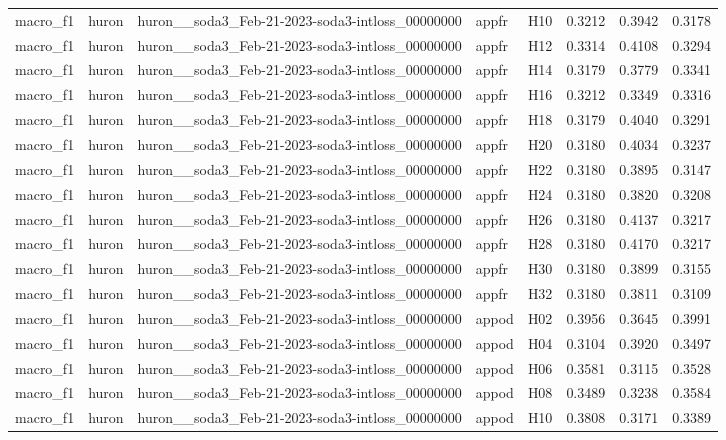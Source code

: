 \begin{table}[tbp]
\begin{tabular}{lllllrrr}
macro\_f1 & huron & huron\_\_soda3\_Feb-21-2023-soda3-intloss\_00000000 & appfr & H10 & 0.3212 & 0.3942 & 0.3178 \\
macro\_f1 & huron & huron\_\_soda3\_Feb-21-2023-soda3-intloss\_00000000 & appfr & H12 & 0.3314 & 0.4108 & 0.3294 \\
macro\_f1 & huron & huron\_\_soda3\_Feb-21-2023-soda3-intloss\_00000000 & appfr & H14 & 0.3179 & 0.3779 & 0.3341 \\
macro\_f1 & huron & huron\_\_soda3\_Feb-21-2023-soda3-intloss\_00000000 & appfr & H16 & 0.3212 & 0.3349 & 0.3316 \\
macro\_f1 & huron & huron\_\_soda3\_Feb-21-2023-soda3-intloss\_00000000 & appfr & H18 & 0.3179 & 0.4040 & 0.3291 \\
macro\_f1 & huron & huron\_\_soda3\_Feb-21-2023-soda3-intloss\_00000000 & appfr & H20 & 0.3180 & 0.4034 & 0.3237 \\
macro\_f1 & huron & huron\_\_soda3\_Feb-21-2023-soda3-intloss\_00000000 & appfr & H22 & 0.3180 & 0.3895 & 0.3147 \\
macro\_f1 & huron & huron\_\_soda3\_Feb-21-2023-soda3-intloss\_00000000 & appfr & H24 & 0.3180 & 0.3820 & 0.3208 \\
macro\_f1 & huron & huron\_\_soda3\_Feb-21-2023-soda3-intloss\_00000000 & appfr & H26 & 0.3180 & 0.4137 & 0.3217 \\
macro\_f1 & huron & huron\_\_soda3\_Feb-21-2023-soda3-intloss\_00000000 & appfr & H28 & 0.3180 & 0.4170 & 0.3217 \\
macro\_f1 & huron & huron\_\_soda3\_Feb-21-2023-soda3-intloss\_00000000 & appfr & H30 & 0.3180 & 0.3899 & 0.3155 \\
macro\_f1 & huron & huron\_\_soda3\_Feb-21-2023-soda3-intloss\_00000000 & appfr & H32 & 0.3180 & 0.3811 & 0.3109 \\
macro\_f1 & huron & huron\_\_soda3\_Feb-21-2023-soda3-intloss\_00000000 & appod & H02 & 0.3956 & 0.3645 & 0.3991 \\
macro\_f1 & huron & huron\_\_soda3\_Feb-21-2023-soda3-intloss\_00000000 & appod & H04 & 0.3104 & 0.3920 & 0.3497 \\
macro\_f1 & huron & huron\_\_soda3\_Feb-21-2023-soda3-intloss\_00000000 & appod & H06 & 0.3581 & 0.3115 & 0.3528 \\
macro\_f1 & huron & huron\_\_soda3\_Feb-21-2023-soda3-intloss\_00000000 & appod & H08 & 0.3489 & 0.3238 & 0.3584 \\
macro\_f1 & huron & huron\_\_soda3\_Feb-21-2023-soda3-intloss\_00000000 & appod & H10 & 0.3808 & 0.3171 & 0.3389 \\

\end{tabular}
\end{table}
